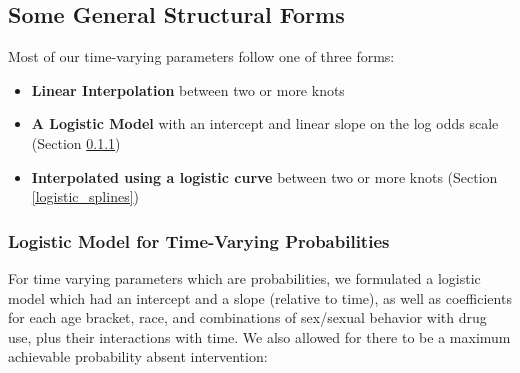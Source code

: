 \documentclass{article}
\begin{document}
\subsection{Some General Structural Forms}

Most of our time-varying parameters follow one of three forms:
\begin{itemize}
	\item \textbf{Linear Interpolation} between two or more knots
	\item \textbf{A Logistic Model} with an intercept and linear slope on the log odds scale (Section \ref{logistic_model})
	\item \textbf{Interpolated using a logistic curve} between two or more knots (Section \ref{logistic_splines})
\end{itemize}

\subsubsection{Logistic Model for Time-Varying Probabilities} \label{logistic_model}
For time varying parameters which are probabilities, we formulated a logistic model which had an intercept and a slope (relative to time), as well as coefficients for each age bracket, race, and combinations of sex/sexual behavior with drug use, plus their interactions with time. We also allowed for there to be a maximum achievable probability absent intervention:
\end{document}
